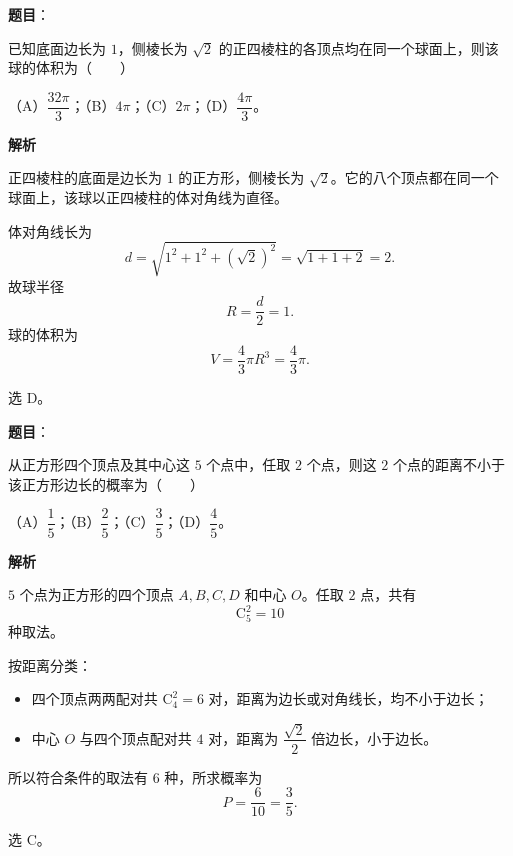 \begin{answer}

\textbf{题目}：

已知底面边长为 $1$，侧棱长为 $\sqrt2$ 的正四棱柱的各顶点均在同一个球面上，则该球的体积为\mbox{（　　）}

（A）$\dfrac{32\pi}{3}$；（B）$4\pi$；（C）$2\pi$；（D）$\dfrac{4\pi}{3}$。

\textbf{解析}

正四棱柱的底面是边长为 $1$ 的正方形，侧棱长为 $\sqrt2$。它的八个顶点都在同一个球面上，该球以正四棱柱的体对角线为直径。

体对角线长为
\nopagebreak[4]
\[d=\sqrt{1^2+1^2+(\sqrt2)^2}=\sqrt{1+1+2}=2.\]
故球半径
\nopagebreak[4]
\[R=\frac d2=1.\]
球的体积为
\nopagebreak[4]
\[V=\frac43\pi R^3=\frac43\pi.\]

选 D。


\end{answer}
\begin{answer}

\textbf{题目}：

从正方形四个顶点及其中心这 $5$ 个点中，任取 $2$ 个点，则这 $2$ 个点的距离不小于该正方形边长的概率为\mbox{（　　）}

（A）$\dfrac15$；（B）$\dfrac25$；（C）$\dfrac35$；（D）$\dfrac45$。

\textbf{解析}

$5$ 个点为正方形的四个顶点 $A,B,C,D$ 和中心 $O$。任取 $2$ 点，共有
\nopagebreak[4]
\[\mathrm C_5^2=10\]
种取法。

按距离分类：

\begin{itemize}
\item 四个顶点两两配对共 $\mathrm C_4^2=6$ 对，距离为边长或对角线长，均不小于边长；
\item 中心 $O$ 与四个顶点配对共 $4$ 对，距离为 $\dfrac{\sqrt2}{2}$ 倍边长，小于边长。
\end{itemize}

所以符合条件的取法有 $6$ 种，所求概率为
\nopagebreak[4]
\[P=\frac6{10}=\frac35.\]

选 C。


\end{answer}

